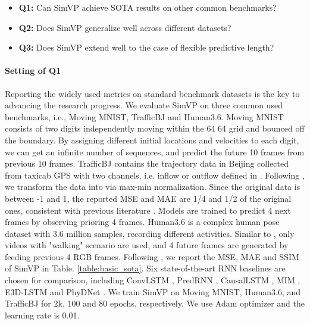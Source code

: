 \documentclass[10pt,twocolumn,letterpaper]{article}
\begin{document}
\begin{itemize}\item \textbf{Q1:} Can SimVP achieve SOTA results on other common benchmarks?
  \setlength{\itemsep}{1pt}
  \setlength{\parsep}{1pt}
  \setlength{\parskip}{1pt}
  
  \item \textbf{Q2:} Does SimVP generalize well across different datasets?
  \setlength{\itemsep}{1pt}
  \setlength{\parsep}{1pt}
  \setlength{\parskip}{1pt}
  \item \textbf{Q3:} Does SimVP extend well to the case of flexible predictive length?
\end{itemize}

\vspace{-5mm}
\paragraph{Setting of Q1} Reporting the widely used metrics on standard benchmark datasets is the key to advancing the research progress. We evaluate SimVP on three common used benchmarks, i.e., Moving MNIST, TrafficBJ and Human3.6.  Moving MNIST \cite{srivastava2015unsupervised} consists of two digits independently moving within the 64  64 grid and bounced off the boundary. By assigning different initial locations and velocities to each digit, we can get an infinite number of sequences, and predict the future 10 frames from previous 10 frames. TrafficBJ contains the trajectory data in Beijing collected from taxicab GPS with two channels, i.e. inflow or outflow defined in \cite{zhang2017deep}.  Following \cite{wang2019memory}, we transform the data into  via max-min normalization. Since the original data is between -1 and 1, the reported MSE and MAE are 1/4 and 1/2 of the original ones, consistent with previous literature \cite{guen2020disentangling,wang2019memory}. Models are trained to predict 4 next frames by observing prioring 4 frames. Human3.6 \cite{ionescu2013human3} is a complex human pose dataset with 3.6 million samples, recording different activities. Similar to \cite{srivastava2015unsupervised,wang2019memory,guen2020disentangling}, only videos with "walking" scenario are used, and 4 future frames are generated by feeding previous 4 RGB frames. Following \cite{guen2020disentangling}, we report the MSE, MAE and SSIM of SimVP in Table. \ref{table:basic_sota}. Six state-of-the-art RNN baselines are chosen for comparison, including ConvLSTM \cite{xingjian2015convolutional}, PredRNN \cite{wang2017predrnn}, CausalLSTM \cite{wang2018predrnn++}, MIM \cite{wang2019memory}, E3D-LSTM \cite{wang2018eidetic} and PhyDNet \cite{guen2020disentangling}. We train SimVP on Moving MNIST, Human3.6, and TrafficBJ for 2k, 100 and 80 epochs, respectively. We use Adam optimizer and the learning rate is 0.01.
\end{document}
